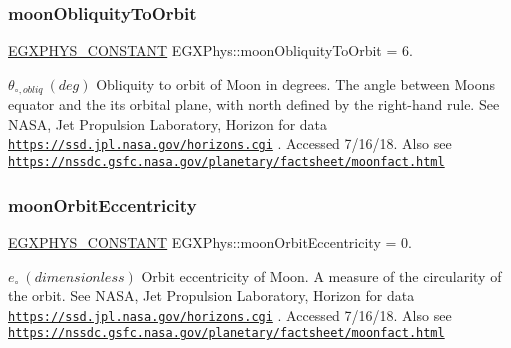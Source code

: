 \subsubsection{\texorpdfstring{moon\+Obliquity\+To\+Orbit}{moonObliquityToOrbit}}
{\footnotesize\ttfamily \mbox{\hyperlink{group___e_g_x_phys-_constants-_macros_ga76980d288494ce1714c9ac68a95ba702}{E\+G\+X\+P\+H\+Y\+S\+\_\+\+C\+O\+N\+S\+T\+A\+NT}} E\+G\+X\+Phys\+::moon\+Obliquity\+To\+Orbit = 6.}

$ \theta_{\circ,obliq} \ (deg)$ Obliquity to orbit of Moon in degrees. The angle between Moon\textquotesingle{}s equator and the it\textquotesingle{}s orbital plane, with north defined by the right-\/hand rule. See N\+A\+SA, Jet Propulsion Laboratory, Horizon for data \href{https://ssd.jpl.nasa.gov/horizons.cgi}{\tt https\+://ssd.\+jpl.\+nasa.\+gov/horizons.\+cgi} . Accessed 7/16/18. Also see \href{https://nssdc.gsfc.nasa.gov/planetary/factsheet/moonfact.html}{\tt https\+://nssdc.\+gsfc.\+nasa.\+gov/planetary/factsheet/moonfact.\+html} \mbox{\label{group___e_g_x_phys-_constants-_astrophysics-_solar_system-_moon-_orbit_gae101303590e8bd4e5d0a4f895e9cbd7a}} 
\subsubsection{\texorpdfstring{moon\+Orbit\+Eccentricity}{moonOrbitEccentricity}}
{\footnotesize\ttfamily \mbox{\hyperlink{group___e_g_x_phys-_constants-_macros_ga76980d288494ce1714c9ac68a95ba702}{E\+G\+X\+P\+H\+Y\+S\+\_\+\+C\+O\+N\+S\+T\+A\+NT}} E\+G\+X\+Phys\+::moon\+Orbit\+Eccentricity = 0.}

$ e_{\circ} \ (dimensionless)$ Orbit eccentricity of Moon. A measure of the circularity of the orbit. See N\+A\+SA, Jet Propulsion Laboratory, Horizon for data \href{https://ssd.jpl.nasa.gov/horizons.cgi}{\tt https\+://ssd.\+jpl.\+nasa.\+gov/horizons.\+cgi} . Accessed 7/16/18. Also see \href{https://nssdc.gsfc.nasa.gov/planetary/factsheet/moonfact.html}{\tt https\+://nssdc.\+gsfc.\+nasa.\+gov/planetary/factsheet/moonfact.\+html} \mbox{\label{group___e_g_x_phys-_constants-_astrophysics-_solar_system-_moon-_orbit_ga74ae6998e1519bfd3f0e52fd2788adde}} 
